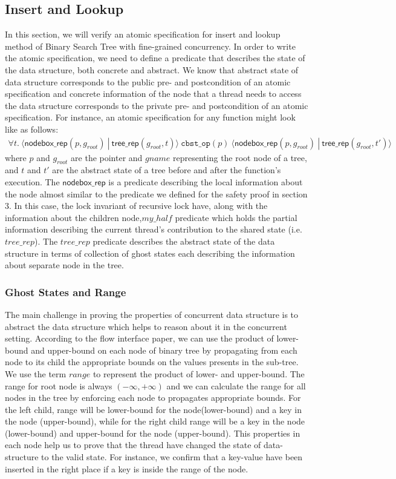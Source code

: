 \documentclass[acmsmall,screen]{acmart}\settopmatter{printfolios=true}
\begin{document}
\subsection{Insert and Lookup}
In this section, we will verify an atomic specification for insert and lookup method of Binary Search Tree with fine-grained concurrency. In order to write the atomic specification, we need to define a predicate that describes the state of the data structure, both concrete and abstract. We know that abstract state of data structure corresponds to the public pre- and postcondition of an atomic specification and concrete information of the node that a thread needs to access the data structure corresponds to the private pre- and postcondition of an atomic specification. For instance, an atomic specification for any function might look like as follows:
\begin{align*}\forall t.\ \langle \mathsf{nodebox\_rep}(p,g_{\mathit{root}})\ |\ \mathsf{tree\_rep}(g_{\mathit{root}}, t)\rangle\ \texttt{cbst\_op}(p)\ \langle \mathsf{nodebox\_rep}(p,g_{\mathit{root}})\ |\ \mathsf{tree\_rep}(g_{\mathit{root}}, t')\rangle
\end{align*}
where $p$ and $g_{\mathit{root}}$ are the pointer and $\mathit{gname}$ representing the root node of a tree, and $t$ and $t'$ are the abstract state of a tree before and after the function's execution. The $\mathsf{nodebox\_rep}$ is a predicate describing the local information about the node almost similar to the predicate we defined for the safety proof in section 3. In this case, the lock invariant of recursive lock have, along with the information about the children node,$\mathit{my\_half}$ predicate which holds the partial information describing the current thread's contribution to the shared state (i.e. $\mathit{tree\_rep}$). The $\mathit{tree\_rep}$ predicate describes the abstract state of the data structure in terms of collection of ghost states each describing the information about separate node in the tree.
\subsubsection{Ghost States and Range}
The main challenge in proving the properties of concurrent data structure is to abstract the data structure which helps to reason about it in the concurrent setting. According to the flow interface paper, we can use the product of lower-bound and upper-bound on each node of binary tree by propagating from each node to its child the appropriate bounds on the values presents in the sub-tree. We use the term $range$ to represent the product of lower- and upper-bound. The range for root node is always $(-\infty,+\infty)$ and we can calculate the range for all nodes in the tree by enforcing each node to propagates appropriate bounds. For the left child, range will be lower-bound for the node(lower-bound) and a key in the node (upper-bound), while for the right child range will be a key in the node (lower-bound) and upper-bound for the node (upper-bound). This properties in each node help us to prove that the thread have changed the state of data-structure to the valid state. For instance, we confirm that a key-value have been inserted in the right place if a key is inside the range of the node.
\end{document}
